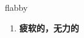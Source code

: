 
\begin{frame}
{\huge flabby}
\begin{center}
\begin{enumerate}\Large
  \item \textbf{疲软的，无力的}
\end{enumerate}
\end{center}
\end{frame}
